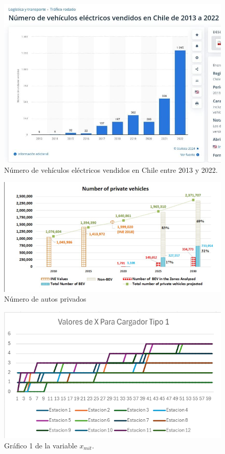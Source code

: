\documentclass[letterpaper]{article}
\begin{document}
\begin{flushleft}
		\begin{figure}[htbp]
			\centering
			\includegraphics[scale=0.4]{imagenes/grafica-1}
			\caption{Número de vehículos eléctricos vendidos en Chile entre 2013 y 2022. \cite{statista}}
			\label{fig:grafica1}
		\end{figure}

		\begin{figure}[htbp]
			\centering
			\includegraphics[scale=0.5]{imagenes/grafica-2}
			\caption{Número de autos privados \cite{paredes}}
			\label{fig:grafica2}
		\end{figure}

		\begin{figure}[htbp]
			\centering
			\includegraphics[scale=0.9]{imagenes/anexo_xmit1.png}
			\caption{Gráfico 1 de la variable $x_{mit}$.}
			\label{fig:grafica-xmit}
		\end{figure}


\end{flushleft}
\end{document}
